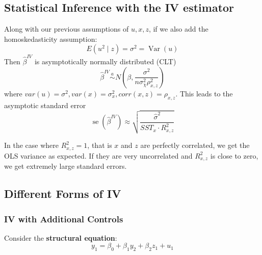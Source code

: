 \documentclass[11pt]{article}
\begin{document}
\subsection{Statistical Inference with the IV estimator}

Along with our previous assumptions of $u,x,z$, if we also add the homoskedasticity assumption:
\begin{equation}
E\left(u^2 \mid z\right)=\sigma^2=\operatorname{Var}(u)
\end{equation}
Then $\hat{\beta}^{IV}$ is asymptotically normally distributed (CLT)
\begin{equation}
\hat{\beta}^{I V} \stackrel{a}{\sim} N\left(\beta, \frac{\sigma^2}{n \sigma_\chi^2 \rho_{x, z}^2}\right)
\end{equation}
where $var(u) = \sigma^2, var(x) = \sigma_x^2, corr(x,z)=\rho_{x,z}$. This leads to the asymptotic standard error
\begin{equation}
\operatorname{se}\left(\hat{\beta}^{I V}\right) \approx \sqrt{\frac{\hat{\sigma}^2}{S S T_x \cdot R_{x, z}^2}}
\end{equation}
\begin{note}
    In the case where $R^2_{x,z}=1$, that is $x$ and $z$ are perfectly correlated, we get the OLS variance as expected. If they are very uncorrelated and $R^2_{x,z}$ is close to zero, we get extremely large standard errors.
\end{note}

\subsection{Different Forms of IV}

\subsubsection{IV with Additional Controls}

Consider the \textbf{structural equation}:
\begin{equation}
y_1=\beta_0+\beta_1 y_2+\beta_2 z_1+u_1
\end{equation}
\end{document}
